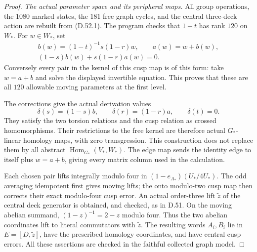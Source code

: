 \begin{proof}
\emph{The actual parameter space and its peripheral maps.}
All group operations, the \(1080\) marked states,
the \(181\) free graph cycles, and the central
three-deck action are rebuilt from (D.52.1).
The program checks that \(1-t\) has rank
\(120\) on \(W_*\). For \(w\in W_*\), set
\[
 \begin{gathered}
 b(w)=(1-t)^{-1}s(1-r)w,\qquad a(w)=w+b(w),\\
 (1-s)b(w)+s(1-r)a(w)=0 .
 \end{gathered}
 \tag{D.52.8}
\]
Conversely every pair in the kernel of this
cusp map is of this form: take \(w=a+b\)
and solve the displayed invertible equation.
This proves that these are all \(120\)
allowable moving parameters at the first level.

The corrections give the actual derivation
values
\[
            \delta(s)=(1-s)b,\qquad
            \delta(r)=(1-r)a,\qquad
            \delta(t)=0 .
 \tag{D.52.9}
\]
They satisfy the two torsion relations and
the cusp relation as crossed homomorphisms.
Their restrictions to the free kernel are
therefore actual \(G_*\)-linear homology maps,
with zero transgression. This construction
does not replace them by all abstract
\(\operatorname{Hom}_{G_*}(V_*,W_*)\).
The edge map sends the identity edge to
itself plus \(w=a+b\), giving every matrix
column used in the calculation.

Each chosen pair lifts integrally modulo
four in \((1-e_{A_*})(U_*/4U_*)\).
The odd averaging idempotent first gives
moving lifts; the onto modulo-two cusp
map then corrects their exact modulo-four
cusp error. An actual order-three lift
\(\widetilde z\) of the central deck generator
is obtained, and checked, as in D.51.
On the moving abelian summand,
\((1-z)^{-1}=2-z\) modulo four.
Thus the two abelian coordinates lift to
literal commutators with \(\widetilde z\).
The resulting words \(A_i,B_i\) lie in
\(E=[D,\widetilde z]\), have the prescribed
homology coordinates, and have central cusp
errors. All these assertions are checked
in the faithful collected graph model.


\end{proof}
